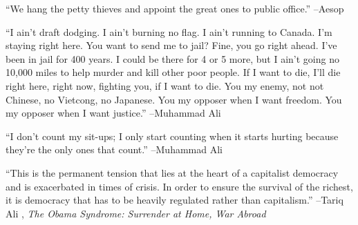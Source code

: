 \documentclass{article}%
\begin{document}
\vspace{1mm}%
\begin{minipage}{\textwidth}%
\flushleft%
“We hang the petty thieves and appoint the great ones to public office.”%
\linebreak%
\vspace{1mm}%
–Aesop%
\linebreak%
\vspace{1mm}%
\end{minipage}%
\linebreak%
\vspace{1mm}%
\begin{minipage}{\textwidth}%
\flushleft%
“I ain't draft dodging. I ain't burning no flag. I ain't running to Canada. I'm staying right here. You want to send me to jail? Fine, you go right ahead. I've been in jail for 400 years. I could be there for 4 or 5 more, but I ain't going no 10,000 miles to help murder and kill other poor people. If I want to die, I'll die right here, right now, fighting you, if I want to die. You my enemy, not not Chinese, no Vietcong, no Japanese. You my opposer when I want freedom. You my opposer when I want justice.”%
\linebreak%
\vspace{1mm}%
–Muhammad Ali%
\linebreak%
\vspace{1mm}%
\end{minipage}%
\linebreak%
\vspace{1mm}%
\begin{minipage}{\textwidth}%
\flushleft%
“I don't count my sit{-}ups; I only start counting when it starts hurting because they're the only ones that count.”%
\linebreak%
\vspace{1mm}%
–Muhammad Ali%
\linebreak%
\vspace{1mm}%
\end{minipage}%
\linebreak%
\vspace{1mm}%
\begin{minipage}{\textwidth}%
\flushleft%
“This is the permanent tension that lies at the heart of a capitalist democracy and is exacerbated in times of crisis. In order to ensure the survival of the richest, it is democracy that has to be heavily regulated rather than capitalism.”%
\linebreak%
\vspace{1mm}%
–Tariq Ali%
, \textit{The Obama Syndrome: Surrender at Home, War Abroad}%
\linebreak%
\vspace{1mm}%
\end{minipage}%
\end{document}

